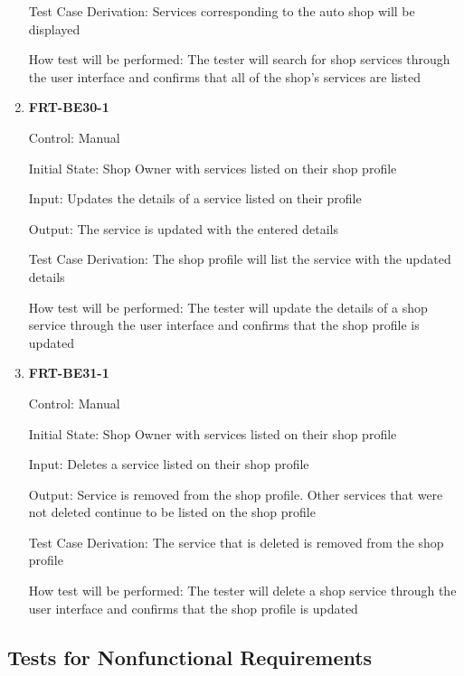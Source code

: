 \documentclass[12pt, titlepage]{article}
\begin{document}
\begin{enumerate}
	      Test Case Derivation: Services corresponding to the auto shop will be displayed

	      How test will be performed: The tester will search for shop services through the user interface and
	      confirms that all of the shop's services are listed

	\item \textbf{FRT-BE30-1}

	      Control: Manual

	      Initial State: Shop Owner with services listed on their shop profile

	      Input: Updates the details of a service listed on their profile

	      Output: The service is updated with the entered details

	      Test Case Derivation: The shop profile will list the service with the updated details

	      How test will be performed: The tester will update the details of a shop service through the user
	      interface and confirms that the shop profile is updated

	\item \textbf{FRT-BE31-1}

	      Control: Manual

	      Initial State: Shop Owner with services listed on their shop profile

	      Input: Deletes a service listed on their shop profile

	      Output: Service is removed from the shop profile. Other services that were not deleted continue to
	      be listed on the shop profile

	      Test Case Derivation: The service that is deleted is removed from the shop profile

	      How test will be performed: The tester will delete a shop service through the user interface and
	      confirms that the shop profile is updated

\end{enumerate}

\subsection{Tests for Nonfunctional Requirements}

\end{document}

